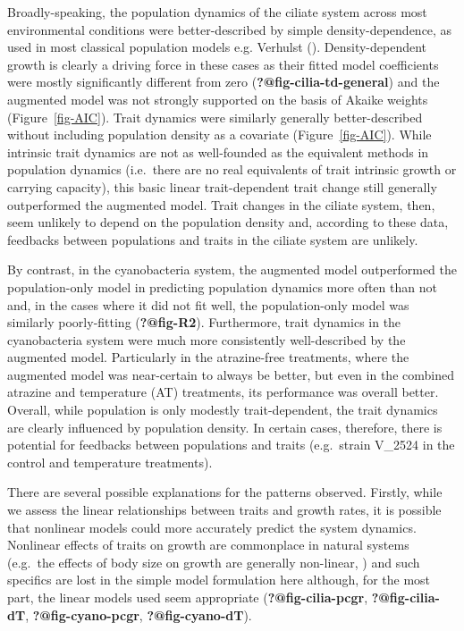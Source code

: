 \documentclass[
  letterpaper,
  DIV=11,
  numbers=noendperiod]{scrartcl}
\begin{document}
Broadly-speaking, the population dynamics of the ciliate system across
most environmental conditions were better-described by simple
density-dependence, as used in most classical population models e.g.
Verhulst (). Density-dependent growth
is clearly a driving force in these cases as their fitted model
coefficients were mostly significantly different from zero
(\textbf{?@fig-cilia-td-general}) and the augmented model was not
strongly supported on the basis of Akaike weights
(Figure~\ref{fig-AIC}). Trait dynamics were similarly generally
better-described without including population density as a covariate
(Figure~\ref{fig-AIC}). While intrinsic trait dynamics are not as
well-founded as the equivalent methods in population dynamics
(i.e.~there are no real equivalents of trait intrinsic growth or
carrying capacity), this basic linear trait-dependent trait change still
generally outperformed the augmented model. Trait changes in the ciliate
system, then, seem unlikely to depend on the population density and,
according to these data, feedbacks between populations and traits in the
ciliate system are unlikely.

By contrast, in the cyanobacteria system, the augmented model
outperformed the population-only model in predicting population dynamics
more often than not and, in the cases where it did not fit well, the
population-only model was similarly poorly-fitting (\textbf{?@fig-R2}).
Furthermore, trait dynamics in the cyanobacteria system were much more
consistently well-described by the augmented model. Particularly in the
atrazine-free treatments, where the augmented model was near-certain to
always be better, but even in the combined atrazine and temperature (AT)
treatments, its performance was overall better. Overall, while
population is only modestly trait-dependent, the trait dynamics are
clearly influenced by population density. In certain cases, therefore,
there is potential for feedbacks between populations and traits
(e.g.~strain V\_2524 in the control and temperature treatments).

There are several possible explanations for the patterns observed.
Firstly, while we assess the linear relationships between traits and
growth rates, it is possible that nonlinear models could more accurately
predict the system dynamics. Nonlinear effects of traits on growth are
commonplace in natural systems (e.g.~the effects of body size on growth
are generally non-linear,
) and such specifics are lost in the simple model formulation here
although, for the most part, the linear models used seem appropriate
(\textbf{?@fig-cilia-pcgr}, \textbf{?@fig-cilia-dT},
\textbf{?@fig-cyano-pcgr}, \textbf{?@fig-cyano-dT}).
\end{document}
